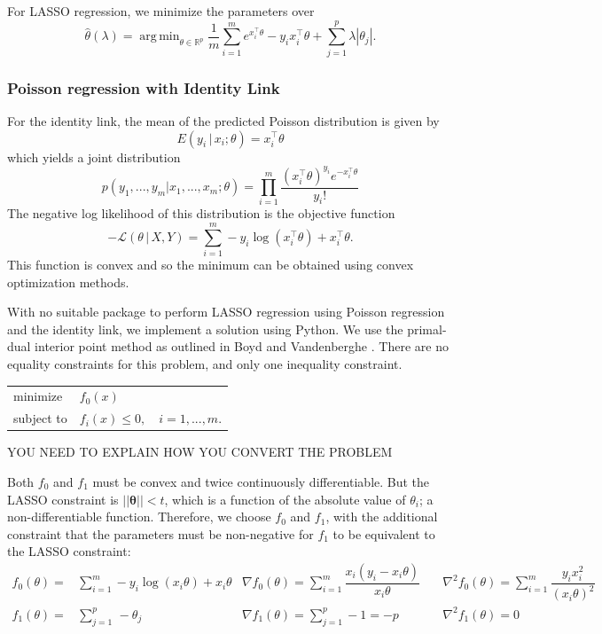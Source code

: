 \documentclass[11pt]{article}
\DeclareMathOperator*{\argmin}{arg\,min}
\begin{document}
For LASSO regression, we minimize the parameters \cite{Young2007} over  
\[\hat{\theta}(\lambda) = \argmin_{\theta\in\mathbb{R}^p}  \frac{1}{m}\sum_{i=1}^m e^{x_i^\top\theta}-y_ix_i^\top\theta  + \sum_{j=1}^p\lambda\left|\theta_j\right|.\]

\subsubsection{Poisson regression with Identity Link}

For the identity link, the mean of the predicted Poisson distribution is given by $$E(y_i\,|\,x_i;\theta) = x_i^\top\theta$$ which yields a joint distribution 
$$p(y_1,...,y_m|x_1,...,x_m;\theta) = \prod_{i=1}^m \frac{\left(x_i^\top\theta\right)^{y_i}e^{-x_i^\top\theta}}{y_i!} $$
The negative log likelihood of this distribution is the objective function
$$-\mathcal{L}\left(\theta\,|\,X, Y\right) = \sum_{i=1}^m -y_i\log{\left(x_i^\top\theta\right)} +x_i^\top\theta. $$ This function is convex and so the minimum can be obtained using convex optimization methods. 

With no suitable package to perform LASSO regression using Poisson regression and the identity link, we implement a solution using Python. We use the primal-dual interior point method as outlined in Boyd and Vandenberghe \cite{Boyd2004}. There are no equality constraints for this problem, and only one inequality constraint.

\begin{center}\begin{tabular}{ll}
minimize &$f_0(x)$\\
subject to &$f_i(x) \leq 0, \quad i = 1, ..., m$.
\end{tabular}\end{center}

YOU NEED TO EXPLAIN HOW YOU CONVERT THE PROBLEM

Both $f_0$ and $f_1$ must be convex and twice continuously differentiable. But the LASSO constraint is $||\boldsymbol{\theta}|| < t$, which is a function of the absolute value of $\theta_i$; a non-differentiable function. Therefore, we choose $f_0$ and $f_1$, with the additional constraint that the parameters must be non-negative for $f_1$ to be equivalent to the LASSO constraint:
\begin{align}
f_0(\theta) =& \sum_{i=1}^m -y_i\log{\left(x_i\theta\right)} +x_i\theta
&\nabla f_0(\theta) = \sum_{i=1}^m \dfrac{x_i\left(y_i-x_i\theta\right)}{x_i\theta}\quad
&\nabla^2 f_0(\theta) = \sum_{i=1}^m\dfrac{y_i x_i^2}{\left(x_i\theta\right)^2}\label{eq:objective}\\[0.2in]
f_1(\theta) =& \sum_{j=1}^p\,-\theta_j
&\nabla f_1(\theta) = \sum_{j=1}^p -1 = -p\quad
&\nabla^2 f_1(\theta) = 0\label{eq:constraints}
\end{align}
\end{document}
